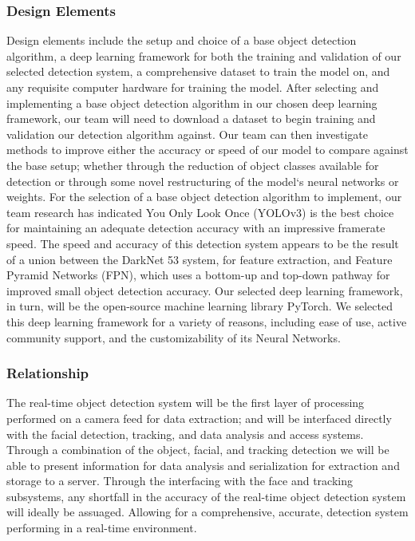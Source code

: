 \documentclass[onecolumn, draftclsnofoot,10pt, compsoc]{IEEEtran}
\begin{document}
\subsubsection{Design Elements}
Design elements include the setup and choice of a base object detection algorithm, a deep learning framework for both the training and validation of our selected detection system, a comprehensive dataset to train the model on, and any requisite computer hardware for training the model. After selecting and implementing a base object detection algorithm in our chosen deep learning framework, our team will need to download a dataset to begin training and validation our detection algorithm against. Our team can then investigate methods to improve either the accuracy or speed of our model to compare against the base setup; whether through the reduction of object classes available for detection or through some novel restructuring of the model`s neural networks or weights. For the selection of a base object detection algorithm to implement, our team research has indicated You Only Look Once (YOLOv3) is the best choice for maintaining an adequate detection accuracy with an impressive framerate speed\cite{YOLOv3}. The speed and accuracy of this detection system appears to be the result of a union between the DarkNet 53 system, for feature extraction, and Feature Pyramid Networks (FPN), which uses a bottom-up and top-down pathway for improved small object detection accuracy. Our selected deep learning framework, in turn, will be the open-source machine learning library PyTorch. We selected this deep learning framework for a variety of reasons, including ease of use, active community support, and the customizability of its Neural Networks.
\subsubsection{Relationship}
The real-time object detection system will be the first layer of processing performed on a camera feed for data extraction; and will be interfaced directly with the facial detection, tracking, and data analysis and access systems. Through a combination of the object, facial, and tracking detection we will be able to present information for data analysis and serialization for extraction and storage to a server. Through the interfacing with the face and tracking subsystems, any shortfall in the accuracy of the real-time object detection system will ideally be assuaged. Allowing for a comprehensive, accurate, detection system performing in a real-time environment.
\end{document}
